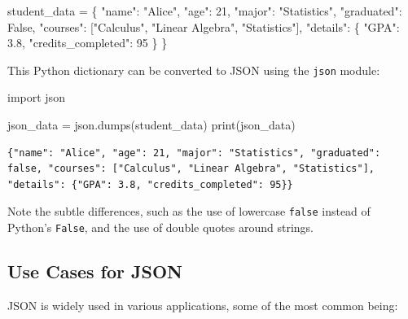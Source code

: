 \documentclass[
  letterpaper,
  DIV=11,
  numbers=noendperiod]{scrreprt}
\newenvironment{Shaded}{\begin{snugshade}}{\end{snugshade}}
\newcommand{\BuiltInTok}[1]{\textcolor[rgb]{0.00,0.23,0.31}{#1}}
\newcommand{\DecValTok}[1]{\textcolor[rgb]{0.68,0.00,0.00}{#1}}
\newcommand{\FloatTok}[1]{\textcolor[rgb]{0.68,0.00,0.00}{#1}}
\newcommand{\ImportTok}[1]{\textcolor[rgb]{0.00,0.46,0.62}{#1}}
\newcommand{\NormalTok}[1]{\textcolor[rgb]{0.00,0.23,0.31}{#1}}
\newcommand{\OperatorTok}[1]{\textcolor[rgb]{0.37,0.37,0.37}{#1}}
\newcommand{\StringTok}[1]{\textcolor[rgb]{0.13,0.47,0.30}{#1}}
\newcommand{\VariableTok}[1]{\textcolor[rgb]{0.07,0.07,0.07}{#1}}
\begin{document}
\begin{Shaded}
\begin{Highlighting}[]
\NormalTok{student\_data }\OperatorTok{=}\NormalTok{ \{}
    \StringTok{"name"}\NormalTok{: }\StringTok{"Alice"}\NormalTok{,}
    \StringTok{"age"}\NormalTok{: }\DecValTok{21}\NormalTok{,}
    \StringTok{"major"}\NormalTok{: }\StringTok{"Statistics"}\NormalTok{,}
    \StringTok{"graduated"}\NormalTok{: }\VariableTok{False}\NormalTok{,}
    \StringTok{"courses"}\NormalTok{: [}\StringTok{"Calculus"}\NormalTok{, }\StringTok{"Linear Algebra"}\NormalTok{, }\StringTok{"Statistics"}\NormalTok{],}
    \StringTok{"details"}\NormalTok{: \{}
        \StringTok{"GPA"}\NormalTok{: }\FloatTok{3.8}\NormalTok{,}
        \StringTok{"credits\_completed"}\NormalTok{: }\DecValTok{95}
\NormalTok{    \}}
\NormalTok{\}}
\end{Highlighting}
\end{Shaded}

This Python dictionary can be converted to JSON using the \texttt{json}
module:

\begin{Shaded}
\begin{Highlighting}[]
\ImportTok{import}\NormalTok{ json}

\NormalTok{json\_data }\OperatorTok{=}\NormalTok{ json.dumps(student\_data)}
\BuiltInTok{print}\NormalTok{(json\_data)}
\end{Highlighting}
\end{Shaded}

\begin{verbatim}
{"name": "Alice", "age": 21, "major": "Statistics", "graduated": false, "courses": ["Calculus", "Linear Algebra", "Statistics"], "details": {"GPA": 3.8, "credits_completed": 95}}
\end{verbatim}

Note the subtle differences, such as the use of lowercase \texttt{false}
instead of Python's \texttt{False}, and the use of double quotes around
strings.

\hypertarget{use-cases-for-json}{%
\subsection{Use Cases for JSON}\label{use-cases-for-json}}

JSON is widely used in various applications, some of the most common
being:
\end{document}
